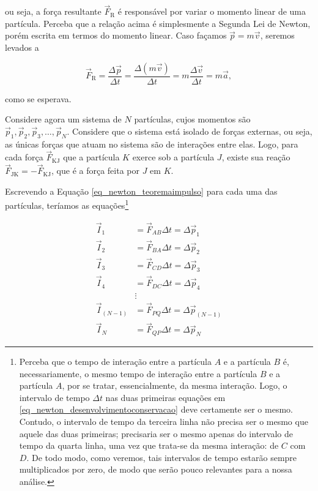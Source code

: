 \noindent ou seja, a força resultante $\vec F_{\text{R}}$ é responsável por variar o momento linear de uma partícula. Perceba que a relação acima é simplesmente a Segunda Lei de Newton, porém escrita em termos do momento linear. Caso façamos $\vec p = m \vec v$, seremos levados a

$$  \vec F_{\text{R}} = \dfrac{\Delta   \vec p}{\Delta t} = \dfrac{\Delta  (m \vec v)}{\Delta t} = m  \dfrac{\Delta \vec v}{\Delta t} = m \vec a,$$

\noindent como se esperava.

Considere agora um sistema de $N$ partículas, cujos momentos são $\vec p_{1}, \vec p_{2}, \vec p_{3}, \dots ,\vec p_{N}$. Considere que o sistema está isolado de forças externas, ou seja, as únicas forças que atuam no sistema são de interações entre elas. Logo, para cada força $\vec F_{\text{KJ}}$ que a partícula $K$ exerce sob a partícula $J$, existe sua reação $\vec F_{\text{JK}}= -\vec F_{\text{KJ}}$, que é a força feita por $J$ em $K.$

Escrevendo a Equação \eqref{eq_newton_teoremaimpulso} para cada uma das partículas, teríamos as equações\footnote{Perceba que o tempo de interação entre a partícula $A$ e a partícula $B$ é, necessariamente, o mesmo tempo de interação entre a partícula $B$ e a partícula $A$, por se tratar, essencialmente, da mesma interação. Logo, o intervalo de tempo $\Delta t$ nas duas primeiras equações em \eqref{eq_newton_desenvolvimentoconservacao} deve certamente ser o mesmo. Contudo, o intervalo de tempo da terceira linha não precisa ser o mesmo que aquele das duas primeiras; precisaria ser o mesmo apenas do intervalo de tempo da quarta linha, uma vez que trata-se da mesma interação: de $C$ com $D.$ De todo modo, como veremos, tais intervalos de tempo estarão sempre multiplicados por zero, de modo que serão pouco relevantes para a nossa análise.}



\begin{equation}
\begin{aligned}
\vec{I}_1 &= \vec{F}_{AB}\Delta t = \Delta \vec{p}_1 \nonumber \\
\vec{I}_2 &= \vec{F}_{BA}\Delta t = \Delta \vec{p}_2 \nonumber \\
\vec{I}_3 &= \vec{F}_{CD}\Delta t = \Delta \vec{p}_3 \nonumber \\
\vec{I}_4 &= \vec{F}_{DC}\Delta t = \Delta \vec{p}_4 \nonumber\\
          &\vdots \nonumber \\
\vec{I}_{(N-1)} &= \vec{F}_{PQ}\Delta t = \Delta \vec{p}_{(N-1)} \nonumber\\
\vec{I}_N &= \vec{F}_{QP}\Delta t = \Delta \vec{p}_N \nonumber
\end{aligned}
\label{eq_newton_desenvolvimentoconservacao}
\end{equation}


